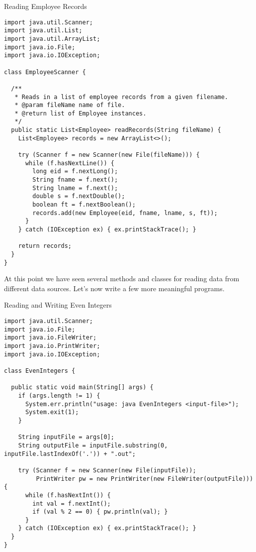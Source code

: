 \begin{cl}{Reading Employee Records}
\begin{lstlisting}[language=MyJava]
import java.util.Scanner;
import java.util.List;
import java.util.ArrayList;
import java.io.File;
import java.io.IOException;

class EmployeeScanner {

  /**
   * Reads in a list of employee records from a given filename.
   * @param fileName name of file.
   * @return list of Employee instances.
   */
  public static List<Employee> readRecords(String fileName) {
    List<Employee> records = new ArrayList<>();

    try (Scanner f = new Scanner(new File(fileName))) {
      while (f.hasNextLine()) {
        long eid = f.nextLong();
        String fname = f.next();
        String lname = f.next();
        double s = f.nextDouble();
        boolean ft = f.nextBoolean();
        records.add(new Employee(eid, fname, lname, s, ft));
      }
    } catch (IOException ex) { ex.printStackTrace(); }

    return records;
  }
}
\end{lstlisting}
\end{cl}

At this point we have seen several methods and classes for reading data from different data sources. Let's now write a few more meaningful programs.


\begin{cl}{Reading and Writing Even Integers}
\begin{lstlisting}[language=MyJava]
import java.util.Scanner;
import java.io.File;
import java.io.FileWriter;
import java.io.PrintWriter;
import java.io.IOException;

class EvenIntegers {

  public static void main(String[] args) {
    if (args.length != 1) {
      System.err.println("usage: java EvenIntegers <input-file>");
      System.exit(1);
    }

    String inputFile = args[0];
    String outputFile = inputFile.substring(0, inputFile.lastIndexOf('.')) + ".out";

    try (Scanner f = new Scanner(new File(inputFile));
         PrintWriter pw = new PrintWriter(new FileWriter(outputFile))) {
      while (f.hasNextInt()) {
        int val = f.nextInt();
        if (val % 2 == 0) { pw.println(val); }
      }
    } catch (IOException ex) { ex.printStackTrace(); }
  }
}
\end{lstlisting}
\end{cl}

